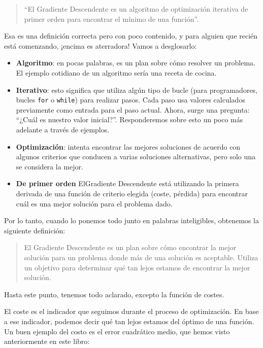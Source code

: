 \documentclass[]{book}
\providecommand{\tightlist}{%
  \setlength{\itemsep}{0pt}\setlength{\parskip}{0pt}}
\begin{document}
\begin{quote}
``El Gradiente Descendente es un algoritmo de optimización iterativa de primer orden para encontrar el mínimo de una función''.
\end{quote}

Esa es una definición correcta pero con poco contenido, y para alguien que recién está comenzando, ¡encima es aterradora! Vamos a desglosarlo:

\begin{itemize}
\tightlist
\item
  \textbf{Algoritmo}: en pocas palabras, es un plan sobre cómo resolver un problema. El ejemplo cotidiano de un algoritmo sería una receta de cocina.
\item
  \textbf{Iterativo}: esto significa que utiliza algún tipo de bucle (para programadores, bucles \texttt{for} o \texttt{while}) para realizar pasos. Cada paso usa valores calculados previamente como entrada para el paso actual. Ahora, surge una pregunta: ``¿Cuál es nuestro valor inicial?''. Responderemos sobre esto un poco más adelante a través de ejemplos.
\item
  \textbf{Optimización}: intenta encontrar las mejores soluciones de acuerdo con algunos criterios que conducen a varias soluciones alternativas, pero solo una se considera la mejor.
\item
  \textbf{De primer orden} ElGradiente Descendente está utilizando la primera derivada de una función de criterio elegida (coste, pérdida) para encontrar cuál es una mejor solución para el problema dado.
\end{itemize}

Por lo tanto, cuando lo ponemos todo junto en palabras inteligibles, obtenemos la siguiente definición:

\begin{quote}
El Gradiente Descendente es un plan sobre cómo encontrar la mejor solución para un problema donde más de una solución es aceptable. Utiliza un objetivo para determinar qué tan lejos estamos de encontrar la mejor solución.
\end{quote}

Hasta este punto, tenemos todo aclarado, excepto la función de costes.

El coste es el indicador que seguimos durante el proceso de optimización. En base a ese indicador, podemos decir qué tan lejos estamos del óptimo de una función. Un buen ejemplo del costo es el error cuadrático medio, que hemos visto anteriormente en este libro:
\end{document}
